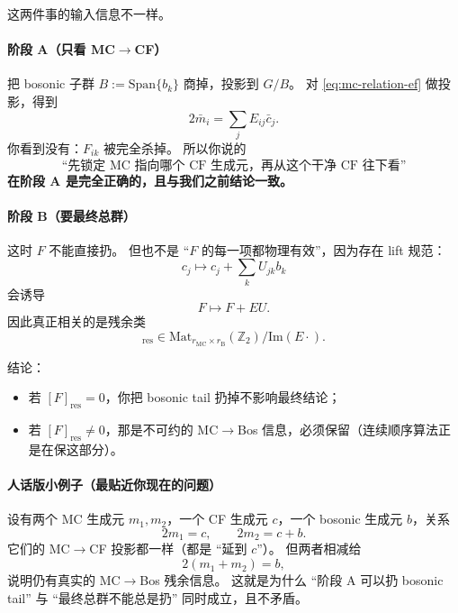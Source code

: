 \documentclass[a4paper,fontset=ubuntu,12pt]{ctexart}
\begin{document}
这两件事的输入信息不一样。

\paragraph{阶段 A（只看 MC$\to$CF）}
把 bosonic 子群 $B:=\mathrm{Span}\{b_k\}$ 商掉，投影到 $G/B$。
对 \eqref{eq:mc-relation-ef} 做投影，得到
\begin{equation}
2\bar m_i=\sum_j E_{ij}\bar c_j.
\label{eq:mc-cf-projection}
\end{equation}
你看到没有：$F_{ik}$ 被完全杀掉。  
所以你说的
\begin{equation}
\text{``先锁定 MC 指向哪个 CF 生成元，再从这个干净 CF 往下看''}
\label{eq:user-idea-clean-cf}
\end{equation}
\textbf{在阶段 A 是完全正确的，且与我们之前结论一致。}

\paragraph{阶段 B（要最终总群）}
这时 $F$ 不能直接扔。  
但也不是 ``$F$ 的每一项都物理有效''，因为存在 lift 规范：
\begin{equation}
c_j\mapsto c_j+\sum_k U_{jk}b_k
\label{eq:cf-lift-change}
\end{equation}
会诱导
\begin{equation}
F\mapsto F+EU.
\label{eq:F-gauge-shift}
\end{equation}
因此真正相关的是残余类
\begin{equation}
[F]_{\mathrm{res}}\in \mathrm{Mat}_{r_{\mathrm{MC}}\times r_{\mathrm{B}}}(\mathbb{Z}_2)\big/\mathrm{Im}(E\cdot).
\label{eq:F-res-class}
\end{equation}

结论：
\begin{itemize}
\item 若 $[F]_{\mathrm{res}}=0$，你把 bosonic tail 扔掉不影响最终结论；
\item 若 $[F]_{\mathrm{res}}\neq 0$，那是不可约的 MC$\to$Bos 信息，必须保留（连续顺序算法正是在保这部分）。
\end{itemize}

\paragraph{人话版小例子（最贴近你现在的问题）}
设有两个 MC 生成元 $m_1,m_2$，一个 CF 生成元 $c$，一个 bosonic 生成元 $b$，关系
\begin{equation}
2m_1=c,\qquad 2m_2=c+b.
\label{eq:toy-two-mc}
\end{equation}
它们的 MC$\to$CF 投影都一样（都是 ``延到 $c$''）。  
但两者相减给
\begin{equation}
2(m_1+m_2)=b,
\label{eq:toy-residual-b}
\end{equation}
说明仍有真实的 MC$\to$Bos 残余信息。  
这就是为什么 ``阶段 A 可以扔 bosonic tail'' 与 ``最终总群不能总是扔'' 同时成立，且不矛盾。
\end{document}
